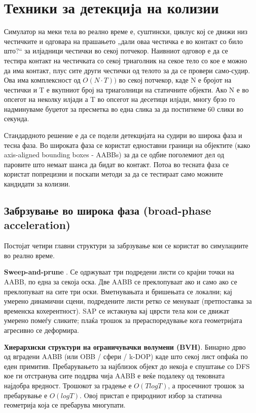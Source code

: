 \newpage
\chapter{Техники за детекција на колизии}
Симулатор на меки тела во реално време е, суштински, циклус кој  се движи низ честичките и одговара на прашањето „дали оваа честичка е во контакт со било што?“ за илјадници честички во секој потчекор. Наивниот одговор е да се тестира контакт  на честичката со секој триаголник на секое тело со кое е можно да има контакт, плус сите други честички од телото за да се провери само-судир. Ова има комплексност од $O(N \cdot T))$ во секој потчекор, каде N е бројот на честички и T е вкупниот број на триаголници на статичните објекти. Ако N е во опсегот на неколку илјади а T во опсегот на десетици илјади, многу брзо го надминуваме буџетот за пресметка во една слика за да постигнеме 60 слики во секунда. 

Стандардното решение е да се подели детекцијата на судири во широка фаза и тесна фаза. Во широката фаза се користат едноставни граници на објектите (како axis-aligned bounding boxes - AABBs) за да се одбие поголемиот дел од паровите што немаат шанса да бидат во контакт. Потоа во тесната фаза се користат попрецизни и поскапи методи за да се тестираат само можните кандидати за колизии.

\section{Забрзување во широка фаза (broad-phase acceleration)}

Постојат четири главни структури за забрзување кои се користат во симулациите во реално време.


\textbf{Sweep-and-prune}\cite{sweep}\cite{cohenSweep} . Се одржуваат три подредени листи со крајни точки на AABB, по една за секоја оска. Две AABB се преклопуваат ако и само ако се преклопуваат на сите три оски. Вметнувањата и бришењата се локални; кај умерено динамични сцени, подредените листи ретко се менуваат (претпоставка за временска кохерентност). SAP се истакнува кај цврсти тела кои се движат умерено помеѓу сликите; плаќа трошок за прераспоредување кога геометријата агресивно се деформира.

\textbf{Хиерархиски структури на ограничувачки волумени (BVH)}. Бинарно дрво од вградени AABB (или OBB / сфери / k-DOP)  каде што секој лист опфаќа по еден примитив. Пребарувањето за најблизок објект до некоја  е спуштање со DFS кое ги отстранува сите поддрва чија AABB е веќе подалеку од тековната најдобра вредност. Трошокот за градење е $O(T log T)$, а просечниот трошок за пребарување е $O(log T)$. Oвој пристап е природниот избор за статична геометрија која се пребарува многупати.
	
